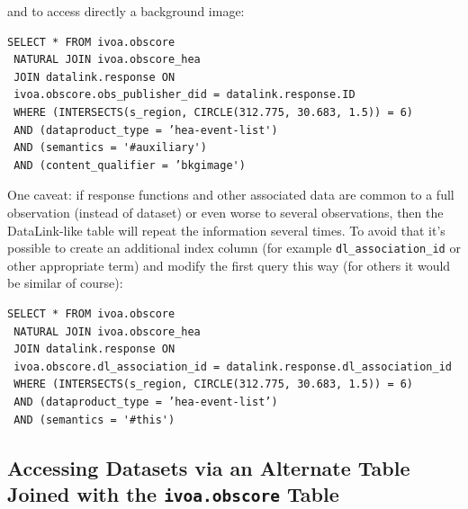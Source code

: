 \noindent and to  access directly a background image:

{\small
\begin{verbatim}
SELECT * FROM ivoa.obscore
 NATURAL JOIN ivoa.obscore_hea
 JOIN datalink.response ON 
 ivoa.obscore.obs_publisher_did = datalink.response.ID
 WHERE (INTERSECTS(s_region, CIRCLE(312.775, 30.683, 1.5)) = 6)
 AND (dataproduct_type = ’hea-event-list')
 AND (semantics = '#auxiliary')
 AND (content_qualifier = ’bkgimage')
\end{verbatim}
}

One caveat: if response functions and other associated data are common to a full observation (instead of dataset) or even worse to several observations, then the DataLink-like table will repeat the information several times. To avoid that it's possible to create an additional index column (for example  {\tt dl\_association\_id} or other appropriate term) and modify the first query this way (for others it would be similar of course):

{\small
\begin{verbatim}
SELECT * FROM ivoa.obscore
 NATURAL JOIN ivoa.obscore_hea
 JOIN datalink.response ON
 ivoa.obscore.dl_association_id = datalink.response.dl_association_id
 WHERE (INTERSECTS(s_region, CIRCLE(312.775, 30.683, 1.5)) = 6)
 AND (dataproduct_type = ’hea-event-list’)
 AND (semantics = '#this')
\end{verbatim}
}

\subsection{Accessing Datasets via an Alternate Table Joined with the {\tt ivoa.obscore} Table}\label{sec:respaccess}



